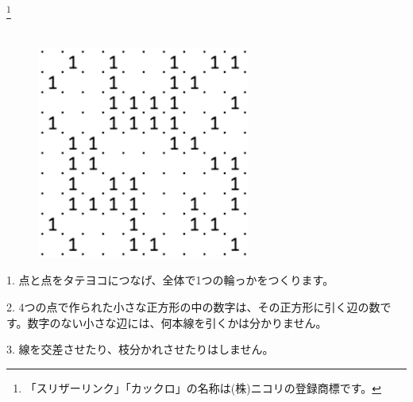 \footnote{「スリザーリンク」「カックロ」の名称は(株)ニコリの登録商標です。}
\leavevmode \\
\\
\begin{figure}[h]
\centering
\includegraphics[width =7cm,bb = 0 0 202 202]{sp1slitherlink}
\end{figure}
\begin{description}
\item{1.} 点と点をタテヨコにつなげ、全体で1つの輪っかをつくります。
\item{2.}  4つの点で作られた小さな正方形の中の数字は、その正方形に引く辺の数です。数字のない小さな辺には、何本線を引くかは分かりません。
\item{3.} 線を交差させたり、枝分かれさせたりはしません。
\end{description}
